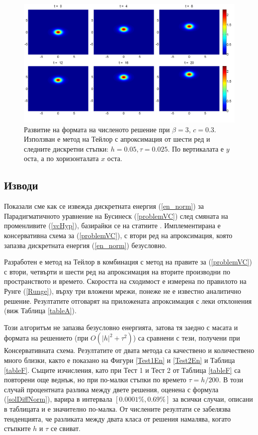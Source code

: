 \documentclass[a4paper]{article}
\newcommand{\rf}[1]{(\ref{#1})}
\theoremstyle{remark}
\begin{document}
\begin{large}
\begin{figure}\vspace{0.2cm}
	\centering
	\includegraphics[width=\linewidth]{SolutionView/TaylorZeroBnd_50_ZB2_bt3_c030_h005_TAll_O(h^6).png}
\caption{Развитие на формата на численото решение при $\beta = 3$, $c=0.3$. Използван е метод на Тейлор с апроксимация от шести ред и следните дискретни стъпки: $h=0.05, \tau = 0.025$. По вертикалата е $y$ оста, а по хоризонталата $x$ оста.}
\label{solShape3}
\end{figure}
\FloatBarrier

\subsection{Изводи}
Показали сме как се извежда дискретната енергия \rf{en_norm} за Парадигматичното уравнение на Бусинеск \rf{problemVC} след смяната на променливите \rf{vcHyp}, 
базирайки се на статиите \cite{ref25, ref999, ref1000}. 
Имплементирана е консервативна схема за \rf{problemVC}, с втори ред на апроксимация, която запазва дискретната енергия \rf{en_norm} безусловно. 

Разработен е метод на Тейлор в комбинация с метод на правите за \rf{problemVC} с втори, четвърти и шести ред на апроксимация на вторите производни по пространството и времето. 
Скоростта на сходимост е измерена по правилото на Рунге \rf{Runge}, върху три вложени мрежи, понеже не е известно аналитично решение. Резултатите отговарят на приложената апроксимация
с леки отклонения (виж Таблица \ref{tableA}). 

Този алгоритъм не запазва безусловно енергията, затова тя заедно с масата и формата на решението (при $O(|h|^2 + \tau^2)$) са сравнени с тези, получени при Консервативната схема.
Резултатите от двата метода са качествено и количествено много близки, както е показано на Фигури \ref{Test1En} и \ref{Test2En} и Таблица \ref{tableF}. 
Същите изчисления, като при Тест 1 и Тест 2 от Таблица \ref{tableF} са повторени още веднъж, но при по-малки стъпки по времето $\tau = h/200$. 
В този случай процентната разлика между двете решения, оценена с формула \rf{solDiffNorm}, варира в интервала $[0.0001\%, 0.69\%]$ за всички случаи, описани в таблицата 
и е значително по-малка. 
От числените резултати се забелязва тенденцията, че разликата между двата класа от решения намалява, 
когато стъпките $h$ и $\tau$ се свиват. 


\end{large}
\end{document}

